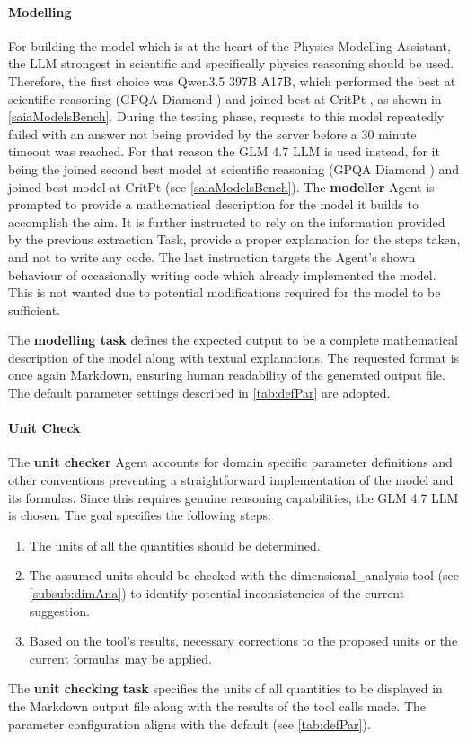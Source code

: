 \documentclass[
	fontsize = 11pt,
	paper = a4,
	draft = false,
	twoside = true,
	titlepage = false
]{scrartcl}
\numberwithin{equation}{subsection}
\begin{document}
	\paragraph{Modelling} \label{par:Modelling}
	For building the model which is at the heart of the Physics Modelling Assistant, the \gls{LLM} strongest in scientific and specifically physics reasoning should be used. Therefore, the first choice was Qwen3.5 397B A17B, which performed the best at scientific reasoning (GPQA Diamond \autocite{gpqaDiamondPaper}) and joined best at CritPt \autocite{critPtArx}, as shown in \autoref{saiaModelsBench}. During the testing phase, requests to this model repeatedly failed with an answer not being provided by the server before a 30 minute timeout was reached. For that reason the GLM 4.7 \gls{LLM} is used instead, for it being the joined second best model at scientific reasoning (GPQA Diamond \autocite{gpqaDiamondPaper}) and joined best model at CritPt \autocite{critPtArx} (see \autoref{saiaModelsBench}). The \textbf{modeller} \gls{Agent} is prompted to provide a mathematical description for the model it builds to accomplish the aim. It is further instructed to rely on the information provided by the previous extraction Task, provide a proper explanation for the steps taken, and not to write any code. The last instruction targets the \gls{Agent}'s shown behaviour of occasionally writing code which already implemented the model. This is not wanted due to potential modifications required for the model to be sufficient.
	
	The \textbf{modelling task} defines the expected output to be a complete mathematical description of the model along with textual explanations. The requested format is once again Markdown, ensuring human readability of the generated output file. The default parameter settings described in \autoref{tab:defPar} are adopted.
	
	\paragraph{Unit Check} \label{par:unitCheck}
	The \textbf{unit checker} \gls{Agent} accounts for domain specific parameter definitions and other conventions preventing a straightforward implementation of the model and its formulas. Since this requires genuine reasoning capabilities, the GLM 4.7 \gls{LLM} is chosen. The goal specifies the following steps:
	\begin{enumerate}
		\item The units of all the quantities should be determined.
		\item The assumed units should be checked with the dimensional\_analysis tool (see \autoref{subsub:dimAna}) to identify potential inconsistencies of the current suggestion.
		\item Based on the tool's results, necessary corrections to the proposed units or the current formulas may be applied.
	\end{enumerate}
	The \textbf{unit checking task} specifies the units of all quantities to be displayed in the Markdown output file along with the results of the tool calls made. The parameter configuration aligns with the default (see \autoref{tab:defPar}).
	
\end{document}
